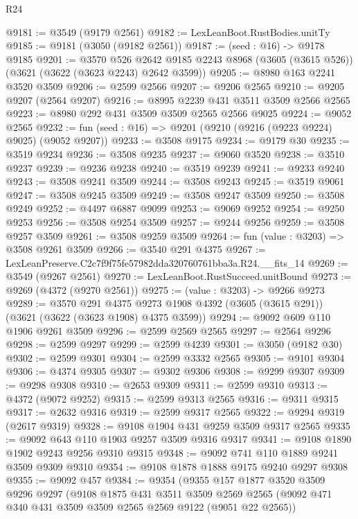 \begin{lexlean}{R24}
\begin{coremodule}
@9181 := @3549 (@9179 @2561)
@9182 := LexLeanBoot.RustBodies.unitTy
@9185 := @9181 (@3050 (@9182 @2561))
@9187 := (seed : @16) -> @9178 @9185
@9201 := @3570
    @526
    @2642
    @9185
    @2243
    @8968
    (@3605 (@3615 @526))
    (@3621 (@3622 (@3623 @2243) @2642 @3599))
@9205 := @8980 @163 @2241 @3520 @3509
@9206 := @2599 @2566
@9207 := @9206 @2565
@9210 := @9205 @9207 (@2564 @9207)
@9216 := @8995 @2239 @431 @3511 @3509 @2566 @2565
@9223 := @8980 @292 @431 @3509 @3509 @2565 @2566 @9025
@9224 := @9052 @2565
@9232 := fun (seed : @16) => @9201 (@9210 (@9216 (@9223 @9224) @9025) (@9052 @9207))
@9233 := @3508 @9175
@9234 := @9179 @30
@9235 := @3519 @9234
@9236 := @3508 @9235
@9237 := @9060 @3520
@9238 := @3510 @9237
@9239 := @9236 @9238
@9240 := @3519 @9239
@9241 := @9233 @9240
@9243 := @3508 @9241 @3509
@9244 := @3508 @9243
@9245 := @3519 @9061
@9247 := @3508 @9245 @3509
@9249 := @3508 @9247 @3509
@9250 := @3508 @9249
@9252 := @4497 @6887 @9099
@9253 := @9069 @9252
@9254 := @9250 @9253
@9256 := @3508 @9254 @3509
@9257 := @9244 @9256
@9259 := @3508 @9257 @3509
@9261 := @3508 @9259 @3509
@9264 := fun (value : @3203) => @3508 @9261 @3509
@9266 := @3540 @291 @4375
@9267 := LexLeanPreserve.C2c7f9f75fe57982dda320760761bba3a.R24.__fits_14
@9269 := @3549 (@9267 @2561)
@9270 := LexLeanBoot.RustSucceed.unitBound
@9273 := @9269 (@4372 (@9270 @2561))
@9275 := (value : @3203) -> @9266 @9273
@9289 := @3570
    @291
    @4375
    @9273
    @1908
    @4392
    (@3605 (@3615 @291))
    (@3621 (@3622 (@3623 @1908) @4375 @3599))
@9294 := @9092 @609 @110 @1906 @9261 @3509
@9296 := @2599 @2569 @2565
@9297 := @2564 @9296
@9298 := @2599 @9297
@9299 := @2599 @4239
@9301 := @3050 (@9182 @30)
@9302 := @2599 @9301
@9304 := @2599 @3332 @2565
@9305 := @9101 @9304
@9306 := @4374 @9305
@9307 := @9302 @9306
@9308 := @9299 @9307
@9309 := @9298 @9308
@9310 := @2653 @9309
@9311 := @2599 @9310
@9313 := @4372 (@9072 @9252)
@9315 := @2599 @9313 @2565
@9316 := @9311 @9315
@9317 := @2632 @9316
@9319 := @2599 @9317 @2565
@9322 := @9294 @9319 (@2617 @9319)
@9328 := @9108 @1904 @431 @9259 @3509 @9317 @2565
@9335 := @9092 @643 @110 @1903 @9257 @3509 @9316 @9317
@9341 := @9108 @1890 @1902 @9243 @9256 @9310 @9315
@9348 := @9092 @741 @110 @1889 @9241 @3509 @9309 @9310
@9354 := @9108 @1878 @1888 @9175 @9240 @9297 @9308
@9355 := @9092 @457
@9384 := @9354
    (@9355
      @157
      @1877
      @3520
      @3509
      @9296
      @9297
      (@9108
        @1875
        @431
        @3511
        @3509
        @2569
        @2565
        (@9092 @471 @340 @431 @3509 @3509 @2565 @2569 @9122 (@9051 @22 @2565))

\end{coremodule}
\end{lexlean}
